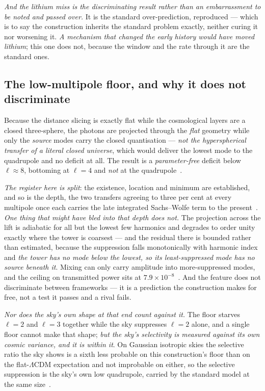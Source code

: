 \documentclass[11pt,a4paper]{article}
\theoremstyle{plain}
\theoremstyle{definition}
\begin{document}
\emph{And the lithium miss is the discriminating result rather than an embarrassment to be noted and passed
over.} It is the standard over-prediction, reproduced --- which is to say the construction inherits the
standard problem exactly, neither curing it nor worsening it. \emph{A mechanism that changed the early
history would have moved lithium}; this one does not, because the window and the rate through it are the
standard ones.

\subsection{The low-multipole floor, and why it does not discriminate}

Because the distance slicing is exactly flat while the cosmological layers are a closed three-sphere, the
photons are projected through the \emph{flat} geometry while only the \emph{source} modes carry the closed
quantisation --- \emph{not the hyperspherical transfer of a literal closed universe}, which would deliver the
lowest mode to the quadrupole and no deficit at all. The result is a \emph{parameter-free} deficit below
$\ell\approx8$, bottoming at $\ell=4$ and \emph{not} at the quadrupole~\cite{JanzenCRcosmology}.

\emph{The register here is split}: the existence, location and minimum are
established, and so is the depth, the two transfers agreeing to three per cent at every multipole once each carries the late
integrated Sachs--Wolfe term to the present~\cite{JanzenCRcosmology}. \emph{One thing that
might have bled into that depth does not.} The projection across the lift is adiabatic for all but the lowest
few harmonics and degrades to order unity exactly where the tower is coarsest --- and the residual there is
bounded rather than estimated, because the suppression falls monotonically with harmonic index and
\emph{the tower has no mode below the lowest, so its least-suppressed mode has no source beneath it}. Mixing
can only carry amplitude into more-suppressed modes, and the ceiling on transmitted power sits at
$7.9\times10^{-8}$~\cite{JanzenCanonicalTime}. And the feature does
not discriminate between frameworks --- it is a prediction the construction makes for free, not a test it
passes and a rival fails.

\emph{Nor does the sky's own shape at that end count against it.} The floor starves $\ell=2$ and $\ell=3$
together while the sky suppresses $\ell=2$ alone, and a single floor cannot make that shape; \emph{but the
sky's selectivity is measured against its own cosmic variance, and it is within it}. On Gaussian isotropic
skies the selective ratio the sky shows is a sixth less probable on this construction's floor than on the
flat-$\Lambda$CDM expectation and not improbable on either, so the selective suppression is the sky's own low
quadrupole, carried by the standard model at the same size~\cite{JanzenCRcosmology}.
\end{document}
